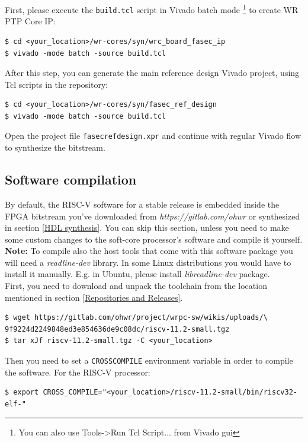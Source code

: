 \documentclass[a4paper, 12pt]{article}
\renewcommand{\_}{\underscore\allowbreak}
\begin{document}
First, please execute the \texttt{build.tcl} script in Vivado batch mode
\footnote{You can also use Tools->Run Tcl Script... from Vivado gui} to create
WR PTP Core IP:
\begin{lstlisting}
$ cd <your_location>/wr-cores/syn/wrc_board_fasec_ip
$ vivado -mode batch -source build.tcl
\end{lstlisting}

After this step, you can generate the main reference design Vivado project,
using Tcl scripts in the repository:
\begin{lstlisting}
$ cd <your_location>/wr-cores/syn/fasec_ref_design
$ vivado -mode batch -source build.tcl
\end{lstlisting}

Open the project file \texttt{fasec\_ref\_design.xpr} and continue with regular
Vivado flow to synthesize the bitstream.

\subsection{Software compilation}
\label{Software compilation}

By default, the RISC-V software for a stable release is embedded
inside the FPGA bitstream you've downloaded from
\textit{https://gitlab.com/ohwr} or
synthesized in section \ref{HDL synthesis}. You can skip this section, unless
you need to make some custom changes to the soft-core processor's software and
compile it yourself.\\

\textbf{Note:} To compile also the host tools that come with this software
package you will need a \emph{readline-dev} library. In some Linux distributions
you would have to install it manually. E.g. in Ubuntu, please install
\emph{libreadline-dev} package.\\

First, you need to download and unpack the toolchain from the location
mentioned in section \ref{Repositories and Releases}.
\begin{lstlisting}
$ wget https://gitlab.com/ohwr/project/wrpc-sw/wikis/uploads/\
9f9224d2249848ed3e854636de9c08dc/riscv-11.2-small.tgz
$ tar xJf riscv-11.2-small.tgz -C <your_location>
\end{lstlisting}

Then you need to set a \texttt{CROSS\_COMPILE} environment variable in order
to compile the software. For the RISC-V processor:
\begin{lstlisting}
$ export CROSS_COMPILE="<your_location>/riscv-11.2-small/bin/riscv32-elf-"
\end{lstlisting}
\end{document}
